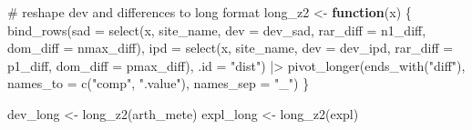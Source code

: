 \documentclass[
  letterpaper,
  DIV=11,
  numbers=noendperiod]{scrartcl}
\newenvironment{Shaded}{\begin{snugshade}}{\end{snugshade}}
\newcommand{\AttributeTok}[1]{\textcolor[rgb]{0.40,0.45,0.13}{#1}}
\newcommand{\CommentTok}[1]{\textcolor[rgb]{0.37,0.37,0.37}{#1}}
\newcommand{\ControlFlowTok}[1]{\textcolor[rgb]{0.00,0.23,0.31}{\textbf{#1}}}
\newcommand{\FunctionTok}[1]{\textcolor[rgb]{0.28,0.35,0.67}{#1}}
\newcommand{\NormalTok}[1]{\textcolor[rgb]{0.00,0.23,0.31}{#1}}
\newcommand{\OtherTok}[1]{\textcolor[rgb]{0.00,0.23,0.31}{#1}}
\newcommand{\SpecialCharTok}[1]{\textcolor[rgb]{0.37,0.37,0.37}{#1}}
\newcommand{\StringTok}[1]{\textcolor[rgb]{0.13,0.47,0.30}{#1}}
\begin{document}
\begin{Shaded}
\begin{Highlighting}[]
\CommentTok{\# reshape dev and differences to long format}
\NormalTok{long\_z2 }\OtherTok{\textless{}{-}} \ControlFlowTok{function}\NormalTok{(x) \{}
    \FunctionTok{bind\_rows}\NormalTok{(}\AttributeTok{sad =} \FunctionTok{select}\NormalTok{(x, site\_name, }
                           \AttributeTok{dev =}\NormalTok{ dev\_sad, }\AttributeTok{rar\_diff =}\NormalTok{ n1\_diff, }
                           \AttributeTok{dom\_diff =}\NormalTok{ nmax\_diff),}
              \AttributeTok{ipd =} \FunctionTok{select}\NormalTok{(x, site\_name, }
                           \AttributeTok{dev =}\NormalTok{ dev\_ipd, }\AttributeTok{rar\_diff =}\NormalTok{ p1\_diff, }
                           \AttributeTok{dom\_diff =}\NormalTok{ pmax\_diff),}
              \AttributeTok{.id =} \StringTok{"dist"}\NormalTok{) }\SpecialCharTok{|\textgreater{}} 
        \FunctionTok{pivot\_longer}\NormalTok{(}\FunctionTok{ends\_with}\NormalTok{(}\StringTok{"diff"}\NormalTok{), }
                     \AttributeTok{names\_to =} \FunctionTok{c}\NormalTok{(}\StringTok{"comp"}\NormalTok{, }\StringTok{".value"}\NormalTok{), }
                     \AttributeTok{names\_sep =} \StringTok{"\_"}\NormalTok{)}
\NormalTok{\}}

\NormalTok{dev\_long }\OtherTok{\textless{}{-}} \FunctionTok{long\_z2}\NormalTok{(arth\_mete)}
\NormalTok{expl\_long }\OtherTok{\textless{}{-}} \FunctionTok{long\_z2}\NormalTok{(expl)}


\end{Highlighting}
\end{Shaded}
\end{document}
